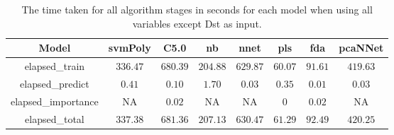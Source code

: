 \begin{table}[!ht]
	\centering
	\begin{tabular}{|c|c|c|c|c|c|c|c|}
		\hline
		Model & svmPoly & C5.0 & nb & nnet & pls & fda & pcaNNet \\ \hline
		elapsed_train & $336.47$ & $680.39$ & $204.88$ & $629.87$ & $60.07$ & $91.61$ & $419.63$ \\ \hline
		elapsed_predict & $0.41$ & $0.10$ & $1.70$ & $0.03$ & $0.35$ & $0.01$ & $0.03$ \\ \hline
		elapsed_importance & NA & $0.02$ & NA & NA & $0$ & $0.02$ & NA \\ \hline
		elapsed_total & $337.38$ & $681.36$ & $207.13$ & $630.47$ & $61.29$ & $92.49$ & $420.25$ \\ \hline
	\end{tabular}
	\caption{The time taken for all algorithm stages in seconds for each model when using all variables except Dst as input.}
	\label{tab:time:reverse:noDst}
\end{table}
